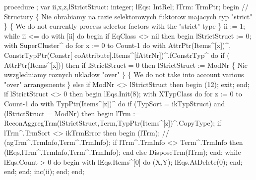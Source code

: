 procedure ;
var
   ii,x,z,lStrictStruct: integer;
   lEqs: IntRel;
   lTrm: TrmPtr;
begin
   // Structury
   \{ Nie obrabiamy na razie selektorowych fuktorow majacych typ "strict" \}
   \{ We do not currently process selector factors with the "strict" type \}
   ii := 1;
   while ii <=  do
      with [ii] do
   begin
      if EqClass <> nil then
      begin
         lStrictStruct := 0;
         with SuperCluster^ do
            for x := 0 to Count-1 do
               with AttrPtr(Items^[x])^,
         ConstrTypPtr(Constr[ coAttribute].Items^[fAttrNr])^.fConstrTyp^ do
            if ( AttrPtr(Items^[x])) then
               if lStrictStruct = 0 then lStrictStruct := ModNr
                  \{ Nie uwzgledniamy roznych ukladow "over" \}
                  \{ We do not take into account various "over" arrangements \}
               else if ModNr <> lStrictStruct then
               begin
                  (12);
                  exit;
               end;
         if lStrictStruct <> 0 then
         begin
            lEqs.Init(8);
            with XTypClass do
               for z := 0 to Count-1 do
                  with TypPtr(Items^[z])^ do
                     if (TypSort = ikTypStruct) and (lStrictStruct = ModNr) then
                     begin
                        lTrm := ReconAggregTrm(lStrictStruct,Term,TypPtr(Items^[z])^.CopyType);
                        if lTrm^.TrmSort <> ikTrmError then
                        begin
                           (lTrm);
                           //             (agTrm^.TrmInfo,Term^.TrmInfo);
                           if lTrm^.TrmInfo <> Term^.TrmInfo then
                              (lEqs,lTrm^.TrmInfo,Term^.TrmInfo);
                        end
                        else DisposeTrm(lTrm);
                     end;
            while lEqs.Count > 0 do
            begin
               with lEqs.Items^[0] do (X,Y);
               lEqs.AtDelete(0);
            end;
         end;
      end;
      inc(ii);
   end;
end;
\eatline
